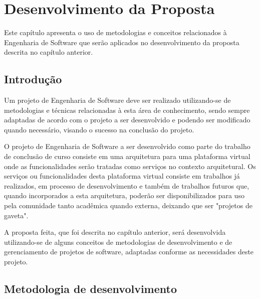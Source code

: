 \chapter[Desenvolvimento da Proposta]{Desenvolvimento da Proposta}

Este capítulo apresenta o uso de metodologias e conceitos relacionados à Engenharia de Software que serão aplicados no desenvolvimento da proposta descrita no capítulo anterior.

\section{Introdução}

Um projeto de Engenharia de Software deve ser realizado utilizando-se de metodologias e técnicas relacionadas à esta área de conhecimento, sendo sempre adaptadas de acordo com o projeto a ser desenvolvido e podendo ser modificado quando necessário, visando o sucesso na conclusão do projeto.

O projeto de Engenharia de Software a ser desenvolvido como parte do trabalho de conclusão de curso consiste em uma arquitetura para uma plataforma virtual onde as funcionalidades serão tratadas como serviços no contexto arquitetural. Os serviços ou funcionalidades desta plataforma virtual consiste em trabalhos já realizados, em processo de desenvolvimento e também de trabalhos futuros que, quando incorporados a esta arquitetura, poderão ser disponibilizados para uso pela comunidade tanto acadêmica quando externa, deixando que ser "projetos de gaveta".

A proposta feita, que foi descrita no capítulo anterior, será desenvolvida utilizando-se de alguns conceitos de metodologias de desenvolvimento e de gerenciamento de projetos de software, adaptadas conforme as necessidades deste projeto.


\section{Metodologia de desenvolvimento}

